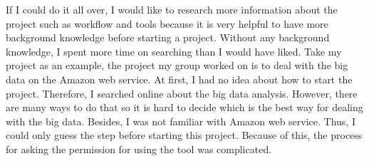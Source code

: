          \noindent If I could do it all over, I would like to research more information about the project such as workflow and tools because it is very helpful to have more background knowledge before starting a project. Without any background knowledge, I spent more time on searching than I would have liked. Take my project as an example, the project my group worked on is to deal with the big data on the Amazon web service. At first, I had no idea about how to start the project. Therefore, I searched online about the big data analysis. However, there are many ways to do that so it is hard to decide which is the best way for dealing with the big data. Besides, I was not familiar with Amazon web service. Thus, I could only guess the step before starting this project. Because of this, the process for asking the permission for using the tool was complicated.\\
         